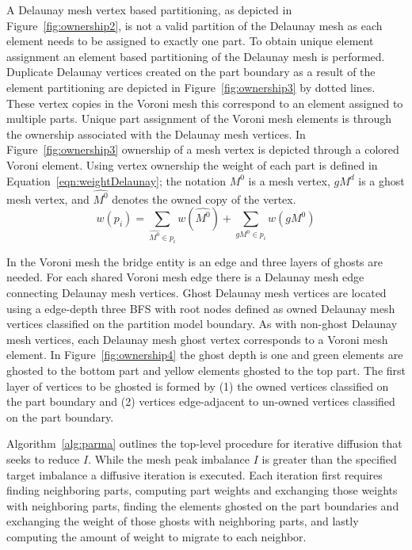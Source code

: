 \documentclass[a4paper]{article}
\begin{document}
A Delaunay mesh vertex based partitioning, as depicted in Figure~\ref{fig:ownership2}, is not a valid partition of the Delaunay mesh as each element needs to be assigned to exactly one part.  To obtain unique element assignment an element based partitioning of the Delaunay mesh is performed.  Duplicate Delaunay vertices created on the part boundary as a result of the element partitioning are depicted in Figure~\ref{fig:ownership3} by dotted lines.  These vertex copies in the Voroni mesh this correspond to an element assigned to multiple parts.  Unique part assignment of the Voroni mesh elements is through the ownership associated with the Delaunay mesh vertices.  In Figure~\ref{fig:ownership3} ownership of a mesh vertex is depicted through a colored Voroni element.  Using vertex ownership the weight of each part is defined in Equation~\ref{eqn:weightDelaunay}; the notation $M^0$ is a mesh vertex, $gM^d$ is a ghost mesh vertex, and $\hat{M^0}$ denotes the owned copy of the vertex.
\begin{equation}
\label{eqn:weightDelaunay}
w(p_i) = \sum_{\hat{M^0} \in p_i}w(\hat{M^0}) + \sum_{gM^0 \in p_i}w(gM^0)
\end{equation}

In the Voroni mesh the bridge entity is an edge and three layers of ghosts are needed.  For each shared Voroni mesh edge there is a Delaunay mesh edge connecting Delaunay mesh vertices.  Ghost Delaunay mesh vertices are located using a edge-depth three BFS with root nodes defined as owned Delaunay mesh vertices classified on the partition model boundary.  As with non-ghost Delaunay mesh vertices, each Delaunay mesh ghost vertex corresponds to a Voroni mesh element.  In Figure~\ref{fig:ownership4} the ghost depth is one and green elements are ghosted to the bottom part and yellow elements ghosted to the top part.  The first layer of vertices to be ghosted is formed by (1) the owned vertices classified on the part boundary and (2) vertices edge-adjacent to un-owned vertices classified on the part boundary.

Algorithm~\ref{alg:parma} outlines the top-level procedure for iterative diffusion that seeks to reduce $I$.  While the mesh peak imbalance $I$ is greater than the specified target imbalance a diffusive iteration is executed.  Each iteration first requires finding neighboring parts, computing part weights and exchanging those weights with neighboring parts, finding the elements ghosted on the part boundaries and exchanging the weight of those ghosts with neighboring parts, and lastly computing the amount of weight to migrate to each neighbor.  
\end{document}
